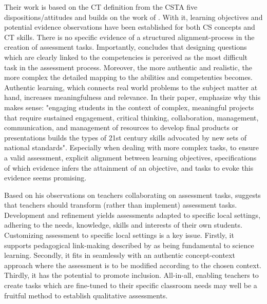 Their work is based on the CT definition from the CSTA five dispositions/attitudes and builds on the work of . With it, learning objectives and potential evidence observations have been established for both CS concepts and CT skills. There is no specific evidence of a structured alignment-process in the creation of assessment tasks. Importantly,  concludes that designing questions which are clearly linked to the competencies is perceived as the most difficult task in the assessment process. Moreover, the more authentic and realistic, the more complex the detailed mapping to the abilities and competenties becomes. Authentic learning, which connects real world problems to the subject matter at hand, increases meaningfulness and relevance. In their paper,  emphasize why this makes sense: "engaging students in the context of complex, meaningful projects that require sustained engagement, critical thinking, collaboration, management, communication, and management of resources to develop final products or presentations builds the types of 21st century skills advocated by new sets of national standards". Especially when dealing with more complex tasks, to ensure a valid assessment, explicit alignment between learning objectives, specifications of which evidence infers the attainment of an objective, and tasks to evoke this evidence seems promising.


Based on his observations on teachers collaborating on assessment tasks, \citeauthor{hermansen2014reworking} suggests that teachers should transform (rather than implement) assessment tasks. Development and refinement yields assessments adapted to specific local settings, adhering to the needs, knowledge, skills and interests of their own students. Customizing assessment to specific local settings is a key issue. Firstly, it supports pedagogical link-making described by  as being fundamental to science learning. Secondly, it fits in seamlessly with an authentic concept-context approach where the assessment is to be modified according to the chosen context. Thirdly, it has the potential to promote inclusion. All-in-all, enabling teachers to create tasks which are fine-tuned to their specific classroom needs may well be a fruitful method to establish qualitative assessments.




